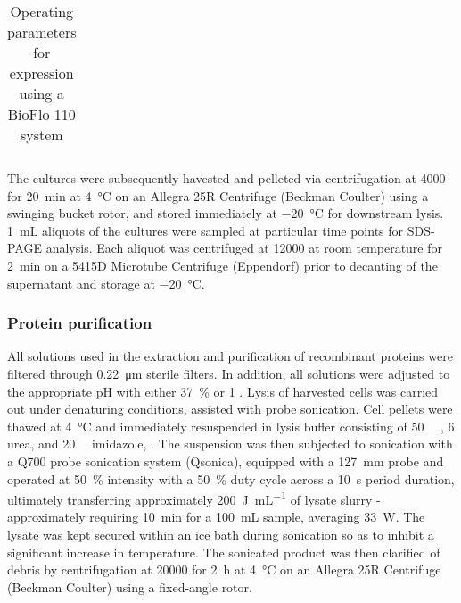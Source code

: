 \begin{refsection}
\begin{table}[h!]
\begin{tabular}{ ll }
  \hline
\end{tabular}
\caption{Operating parameters for expression using a BioFlo 110 system}
\label{tab:bioreactor_parameters}
\end{table}
The cultures were subsequently havested and pelleted via centrifugation at
\SI{4000}{\gforce} for \SI{20}{\minute} at \SI{4}{\celsius} on an Allegra 25R
Centrifuge (Beckman Coulter) using a swinging bucket rotor, and stored
immediately at \SI{-20}{\celsius} for downstream lysis. \SI{1}{\mL} aliquots of
the cultures were sampled at particular time points for SDS-PAGE analysis. Each
aliquot was centrifuged at \SI{12000}{\rpm} at room temperature for
\SI{2}{\minute} on a 5415D Microtube Centrifuge (Eppendorf) prior to decanting
of the supernatant and storage at \SI{-20}{\celsius}.

\subsubsection{Protein purification}
All solutions used in the extraction and purification of recombinant proteins
were filtered through \SI{0.22}{\um} sterile filters. In addition, all solutions
were adjusted to the appropriate pH with either \SI{37}{\percent}  or
\SI{1}{\moLar} . Lysis of harvested cells was carried out under
denaturing conditions, assisted with probe sonication. Cell pellets were thawed
at \SI{4}{\celsius} and immediately resuspended in lysis buffer consisting of
\SI{50}{\milli\moLar} , \SI{6}{\moLar} urea, and
\SI{20}{\milli\moLar} imidazole, . The suspension was then subjected to
sonication with a Q700 probe sonication system (Qsonica), equipped with a
\SI{127}{\mm} probe and operated at \SI{50}{\percent} intensity with a
\SI{50}{\percent} duty cycle across a \SI{10}{\second} period duration,
ultimately transferring approximately \SI{200}{\joule\per\mL} of lysate slurry -
approximately requiring \SI{10}{\minute} for a \SI{100}{\mL} sample, averaging
\SI{33}{\watt}. The lysate was kept secured within an ice bath during sonication
so as to inhibit a significant increase in temperature. The sonicated product
was then clarified of debris by centrifugation at \SI{20000}{\gforce} for
\SI{2}{\hour} at \SI{4}{\celsius} on an Allegra 25R Centrifuge (Beckman Coulter)
using a fixed-angle rotor.


\end{refsection}
